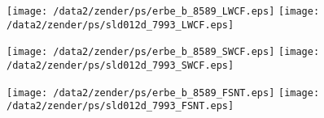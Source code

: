 \documentclass[twocolumn,final,11pt]{article}
\begin{document}
\setlength\abovecaptionskip{9pt}
\setlength\belowcaptionskip{9pt}

\setlength\floatsep{0pt}
\setlength\textfloatsep{0pt}
\setlength\dblfloatsep{0pt}
\setlength\dbltextfloatsep{0pt}
\setlength\intextsep{0pt}

\setcounter{page}{1}
\pagestyle{myheadings}
\thispagestyle{empty}
\onecolumn
\listoffigures
\twocolumn
{}
\setcounter{page}{1}


\pagestyle{empty}
\markright{}

\begin{figure*}
\begin{center}
\texttt{[image: /data2/zender/ps/erbe\_b\_8589\_LWCF.eps]}\vfill
\vspace{.5in}
\texttt{[image: /data2/zender/ps/sld012d\_7993\_LWCF.eps]}\vfill
\end{center}
\end{figure*}
\clearpage

\begin{figure*}
\begin{center}
\texttt{[image: /data2/zender/ps/erbe\_b\_8589\_SWCF.eps]}\vfill
\vspace{.5in}
\texttt{[image: /data2/zender/ps/sld012d\_7993\_SWCF.eps]}\vfill
\end{center}
\end{figure*}
\clearpage

\begin{figure*}
\begin{center}
\texttt{[image: /data2/zender/ps/erbe\_b\_8589\_FSNT.eps]}\vfill
\vspace{.5in}
\texttt{[image: /data2/zender/ps/sld012d\_7993\_FSNT.eps]}\vfill
\end{center}
\end{figure*}
\clearpage
\end{document}
